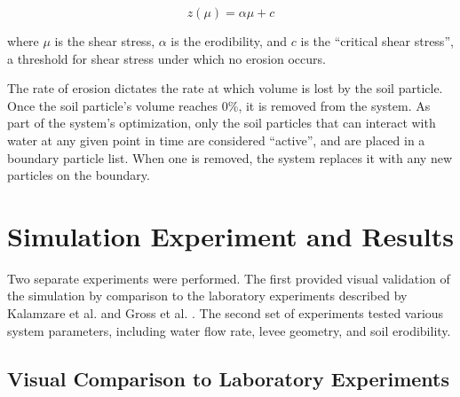 \begin{equation}
\label{equation:ShearStress}
  z\left(\mu\right) = \alpha \mu + c
\end{equation}

\noindent where $\mu$ is the shear stress, $\alpha$ is the erodibility, and $c$ is the ``critical shear stress'', a threshold for shear stress under which no erosion occurs.

The rate of erosion dictates the rate at which volume is lost by the soil particle. Once the soil particle's volume reaches 0\%, it is removed from the system. As part of the system's optimization, only the soil particles that can interact with water at any given point in time are considered ``active'', and are placed in a boundary particle list. When one is removed, the system replaces it with any new particles on the boundary.

\section{Simulation Experiment and Results}
\label{section:ErosionSimulationResults}

Two separate experiments were performed. The first provided visual validation of the simulation by comparison to the laboratory experiments described 
by Kalamzare et al. \cite{Kamalzare-ValidationOfErosionModeling} and Gross et al. \cite{gross_icse_2010}.
The second set of experiments tested various system parameters, including water flow rate, levee geometry, and soil erodibility.

\subsection{Visual Comparison to Laboratory Experiments}

